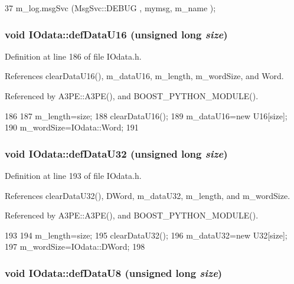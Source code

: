 \begin{DoxyCode}
37 { m_log.msgSvc (MsgSvc::DEBUG   , mymsg, m_name ); }
\end{DoxyCode}
\hypertarget{classIOdata_a9e37c736d6dfb5223ed45786fad403da}{
\subsubsection[{defDataU16}]{\setlength{\rightskip}{0pt plus 5cm}void IOdata::defDataU16 (unsigned long {\em size})}}
\label{classIOdata_a9e37c736d6dfb5223ed45786fad403da}


Definition at line 186 of file IOdata.h.

References clearDataU16(), m\_\-dataU16, m\_\-length, m\_\-wordSize, and Word.

Referenced by A3PE::A3PE(), and BOOST\_\-PYTHON\_\-MODULE().


\begin{DoxyCode}
186                                      {
187     m_length=size;
188     clearDataU16();
189     m_dataU16=new U16[size];
190     m_wordSize=IOdata::Word;
191   }
\end{DoxyCode}
\hypertarget{classIOdata_a78e50aa4a6c967cba195e77fe911a8c3}{
\subsubsection[{defDataU32}]{\setlength{\rightskip}{0pt plus 5cm}void IOdata::defDataU32 (unsigned long {\em size})}}
\label{classIOdata_a78e50aa4a6c967cba195e77fe911a8c3}


Definition at line 193 of file IOdata.h.

References clearDataU32(), DWord, m\_\-dataU32, m\_\-length, and m\_\-wordSize.

Referenced by A3PE::A3PE(), and BOOST\_\-PYTHON\_\-MODULE().


\begin{DoxyCode}
193                                      {
194     m_length=size;
195     clearDataU32();
196     m_dataU32=new U32[size];
197     m_wordSize=IOdata::DWord;
198   }
\end{DoxyCode}
\hypertarget{classIOdata_a80bb230b61062b447db5832e43bf7b44}{
\subsubsection[{defDataU8}]{\setlength{\rightskip}{0pt plus 5cm}void IOdata::defDataU8 (unsigned long {\em size})}}
\label{classIOdata_a80bb230b61062b447db5832e43bf7b44}


